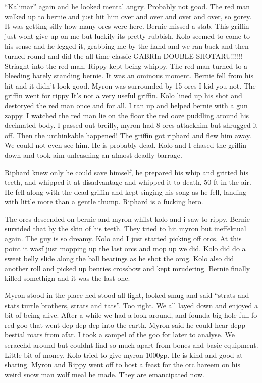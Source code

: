 \begin{multicols}{2}
“Kalimar” again and he looked mental angry. Probably not good. The red man walked up to bernie and just hit him over and over and over and over, so gorey. It was getting silly how many orcs were here. Bernie missed a stab. This griffin just wont give up on me but luckily its pretty rubbish. Kolo seemed to come to his sense and he legged it, grabbing me by the hand and we ran back and then turned round and did the all time classic GABRIn DOUBLE SHOTARU!!!!!! Striaght into the red man. Rippy kept being whippy. The red man turned to a bleeding barely standing bernie. It was an ominous moment. Bernie fell from his hit and it didn’t look good. Myron was surrounded by 15 orcs I kid you not. The griffin went for rippy It’s not a very useful griffin. Kolo lined up his shot and destoryed the red man once and for all. I ran up and helped bernie with a gun zappy. I watched the red man lie on the floor the red ooze puddling around his decimated body. I passed out breifly, myron had 8 orcs attackhim but shrugged it off. Then the unthinkable happened! The griffin got riphard and flew him away. We could not even see him. He is probably dead. Kolo and I chased the griffin down and took aim unleashing an almost deadly barrage.\medskip

Riphard knew only he could save himself, he prepared his whip and gritted his teeth, and whipped it at disadvantage and whipped it to death, 50 ft in the air. He fell along with the dead griffin and kept singing his song as he fell, landing with little more than a gentle thump. Riphard is a fucking hero.\medskip

The orcs descended on bernie and myron whilst kolo and i saw to rippy. Bernie survided that by the skin of his teeth. They tried to hit myron but ineffektual again. The guy is so dreamy. Kolo and I just started picking off orcs. At this point it wasf just mopping up the last orcs and mop up we did. Kolo did do a sweet belly slide along the ball bearings as he shot the orog. Kolo also did another roll and picked up benries crossbow and kept mrudering. Bernie finally killed somethign and it was the last one.\medskip

Myron stood in the place hed stood all fight, looked smug and said “strats and stats turtle brothers, strats and tats”. Too right. We all layed down and enjoyed a bit of being alive. After a while we had a look around, and founda big hole full fo red goo that went dep dep dep into the earth. Myron said he could hear depp bestial roars from afar. I took a sampel of the goo for later to analyse. We seracehd around but couldnt find so much apart from bones and basic equipment. Little bit of money. Kolo tried to give myron 1000gp. He is kind and good at sharing. Myron and Rippy went off to host a feast for the orc hareem on his weird snow man wolf meal he made. They are emancipated now.\medskip


\end{multicols}
